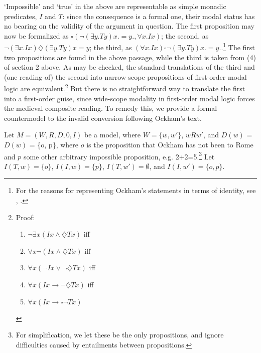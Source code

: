 	
	`Impossible' and `true' in the above are representable as simple monadic predicates, $I$ and $T$: since the consequence is a formal one, their modal status has no bearing on the validity of the argument in question. The first proposition may now be formalized as $\square(\neg (\exists y.Ty)x. = y., \forall x.Ix)$; the second, as $\neg (\exists x.Ix)\diamondsuit (\exists y.Ty)x=y$; the third, as $(\forall x.Ix)\square \neg (\exists y.Ty)x.=y.$.\footnote{For the reasons for representing Ockham's statements in terms of identity, see \cite{Klima1999}, \cite{Klima2008a}.} The first two propositions are found in the above passage, while the third is taken from (4) of section 2 above. As may be checked, the standard translations of the third and (one reading of) the second into narrow scope propositions of first-order modal logic are equivalent.\footnote{Proof: \begin{enumerate}
			\item $\neg\exists x(Ix \wedge \diamondsuit Tx)$ iff
			\item $\forall x \neg(Ix \wedge \diamondsuit Tx)$ iff
			\item $\forall x (\neg Ix \vee \neg\diamondsuit Tx)$ iff
			\item $\forall x (Ix \rightarrow \neg \diamondsuit Tx)$ iff
			\item $\forall x (Ix \rightarrow \square \neg Tx)$
		\end{enumerate}} 
		But there is no straightforward way to translate the first into a first-order guise, since wide-scope modality in first-order modal logic forces the medieval composite reading. To remedy this, we provide a formal countermodel to the invalid conversion following Ockham's text.
		
		Let $M = (W, R, D, 0, I)$ be a model, where $W = \{w, w'\}$, $wRw'$, and $D(w)$ = $D(w)$ = \{o, p\}, where $o$ is the proposition that Ockham has not been to Rome and $p$ some other arbitrary impossible proposition, e.g. 2+2=5.\footnote{For simplification, we let these be the only propositions, and ignore difficulties caused by entailments between propositions.} Let $I(T, w) = \{o\}$, $I(I, w) = \{p\}$, $I(T, w') = \emptyset$, and $I(I, w') = \{o, p\}$.
		
